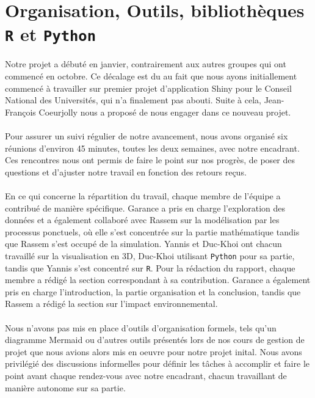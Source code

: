 \documentclass[12pt]{article}
\begin{document}
\section{Organisation, Outils, bibliothèques \texttt{R} et \texttt{Python}}
Notre projet a débuté en janvier, contrairement aux autres groupes qui ont commencé en octobre. Ce décalage est du au fait que nous ayons initiallement commencé à travailler sur  premier projet d'application Shiny pour le Conseil National des Universités, qui n'a finalement pas abouti. Suite à cela, Jean-François Coeurjolly nous a proposé de nous engager dans ce nouveau projet.\\
\\
Pour assurer un suivi régulier de notre avancement, nous avons organisé six réunions d'environ 45 minutes, toutes les deux semaines, avec notre encadrant. Ces rencontres nous ont permis de faire le point sur nos progrès, de poser des questions et d'ajuster notre travail en fonction des retours reçus.\\
\\
En ce qui concerne la répartition du travail, chaque membre de l'équipe a contribué de manière spécifique. Garance a pris en charge l'exploration des données et a également collaboré avec Rassem sur la modélisation par les processus ponctuels, où elle s'est concentrée sur la partie mathématique tandis que Rassem s'est occupé de la simulation. Yannis et Duc-Khoi ont chacun travaillé sur la visualisation en 3D, Duc-Khoi utilisant \texttt{Python} pour sa partie, tandis que Yannis s'est concentré sur \texttt{R}. Pour la rédaction du rapport, chaque membre a rédigé la section correspondant à sa contribution. Garance a également pris en charge l'introduction, la partie organisation et la conclusion, tandis que Rassem a rédigé la section sur l'impact environnemental.\\
\\
Nous n'avons pas mis en place d'outils d'organisation formels, tels qu'un diagramme Mermaid ou d'autres outils présentés lors de nos cours de gestion de projet que nous avions alors mis en oeuvre pour notre projet inital. Nous avons privilégié des discussions informelles pour définir les tâches à accomplir et faire le point avant chaque rendez-vous avec notre encadrant, chacun travaillant de manière autonome sur sa partie.\\
\\
\end{document}
